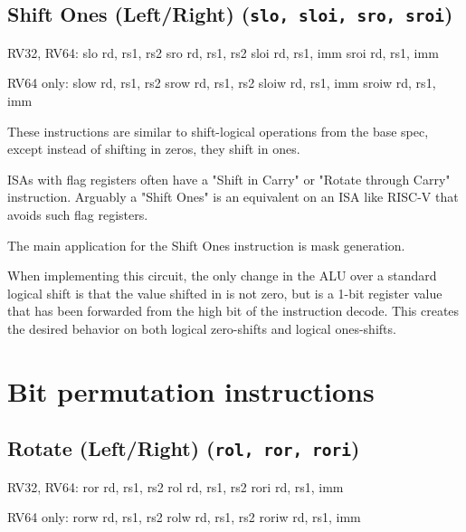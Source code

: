 \subsection{Shift Ones (Left/Right) (\texttt{slo,\ sloi,\ sro,\ sroi})}

\begin{rvb}
  RV32, RV64:
    slo  rd, rs1, rs2
    sro  rd, rs1, rs2
    sloi rd, rs1, imm
    sroi rd, rs1, imm

  RV64 only:
    slow  rd, rs1, rs2
    srow  rd, rs1, rs2
    sloiw rd, rs1, imm
    sroiw rd, rs1, imm
\end{rvb}

These instructions are similar to shift-logical operations from the base
spec, except instead of shifting in zeros, they shift in ones.



ISAs with flag registers often have a "Shift in Carry" or "Rotate through Carry" instruction.
Arguably a "Shift Ones" is an equivalent on an ISA like RISC-V that avoids such flag registers.

The main application for the Shift Ones instruction is mask generation.

When implementing this circuit, the only change in the ALU over a
standard logical shift is that the value shifted in is not zero, but is
a 1-bit register value that has been forwarded from the high bit of the
instruction decode. This creates the desired behavior on both logical
zero-shifts and logical ones-shifts.


\section{Bit permutation instructions}


\subsection{Rotate (Left/Right) (\texttt{rol,\ ror,\ rori})}

\begin{rvb}
  RV32, RV64:
    ror  rd, rs1, rs2
    rol  rd, rs1, rs2
    rori rd, rs1, imm

  RV64 only:
    rorw  rd, rs1, rs2
    rolw  rd, rs1, rs2
    roriw rd, rs1, imm
\end{rvb}

